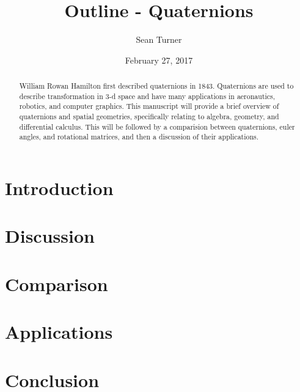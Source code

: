 \documentclass{article}
\begin{document}
\nocite{*}
\title{Outline - Quaternions}
\date{February 27, 2017}
\author{Sean Turner}

\maketitle

\begin{abstract}
\noindent William Rowan Hamilton first described quaternions in 1843.
Quaternions are used to describe transformation in 3-d space and have many applications in aeronautics, robotics, and computer graphics.
This manuscript will provide a brief overview of quaternions and spatial geometries, specifically relating to algebra, geometry, and differential calculus.
This will be followed by a comparision between quaternions, euler angles, and rotational matrices, and then a discussion of their applications.
\end{abstract}

\section{Introduction}


\section{Discussion}


\section{Comparison}


\section{Applications}


\section{Conclusion}


\newpage


\end{document}
